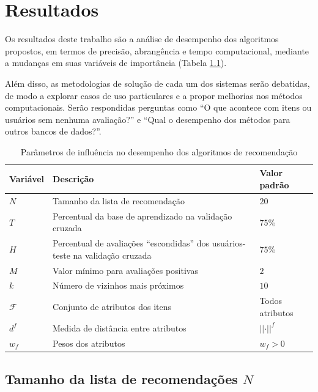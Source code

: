 \chapter[Resultados]{Resultados}
\label{chap:resultados}

Os resultados deste trabalho são a análise de desempenho dos algoritmos propostos, em termos de precisão, abrangência e tempo computacional, mediante a mudanças em suas variáveis de importância (Tabela \ref{tab:variaveis}).

Além disso, as metodologias de solução de cada um dos sistemas serão debatidas, de modo a explorar casos de uso particulares e a propor melhorias nos métodos computacionais. Serão respondidas perguntas como ``O que acontece com itens ou usuários sem nenhuma avaliação?'' e ``Qual o desempenho dos métodos para outros bancos de dados?''.

\begin{table}[hp]
\begin{center}
    \caption{Parâmetros de influência no desempenho dos algoritmos de recomendação}
    \label{tab:variaveis}
    \begin{tabular}{  | p{2cm} | p{7cm} | p{3.5cm} | } 
    \hline
    \textbf{Variável} & \textbf{Descrição} & \textbf{Valor padrão}  \\ \hline
    $N$ & Tamanho da lista de recomendação & $20$ \\ \hline   
    $T$ & Percentual da base de aprendizado na validação cruzada & $75\%$ \\ \hline
    $H$ & Percentual de avaliações ``escondidas'' dos usuários-teste na validação cruzada & $75\%$ \\ \hline
    $M$ & Valor mínimo para avaliações positivas & $2$ \\ \hline
    $k$ & Número de vizinhos mais próximos & $10$ \\ \hline
    $\mathcal{F}$ & Conjunto de atributos dos itens & Todos atributos \\ \hline
    $d^f$ & Medida de distância entre atributos & $\left|\left|\cdot\right|\right|^f$ \\ \hline
    $w_f$ & Pesos dos atributos & $w_f>0$ \\ \hline
    \end{tabular}
\end{center}
\end{table}

\section{Tamanho da lista de recomendações $N$} %
\label{sec:tamanho_da_lista_de_recomenda_es_}

